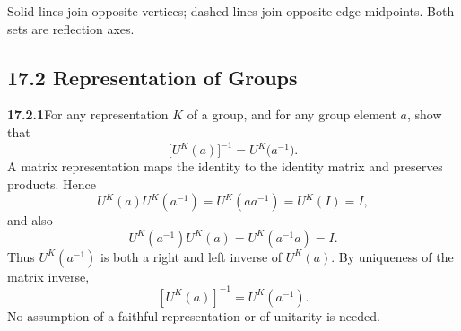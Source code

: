 \begin{center}

\small Solid lines join opposite vertices; dashed lines join
opposite edge midpoints. Both sets are reflection axes.\normalsize
\end{center}

\subsection*{17.2 Representation of Groups}

\par\bigskip
\noindent\textbf{17.2.1}\quad For any representation $K$ of a group,
and for any group element $a$, show that
\[
\big[U^{K}(a)\big]^{-1}=U^{K}\big(a^{-1}\big).
\]
\solution
A matrix representation maps the identity to the identity matrix
and preserves products. Hence
\[
U^K(a)U^K(a^{-1})=U^K(aa^{-1})=U^K(I)=I,
\]
and also
\[
U^K(a^{-1})U^K(a)=U^K(a^{-1}a)=I.
\]
Thus $U^K(a^{-1})$ is both a right and left inverse of $U^K(a)$.
By uniqueness of the matrix inverse,
\[
\boxed{[U^K(a)]^{-1}=U^K(a^{-1})}.
\]
No assumption of a faithful representation or of unitarity is needed.

